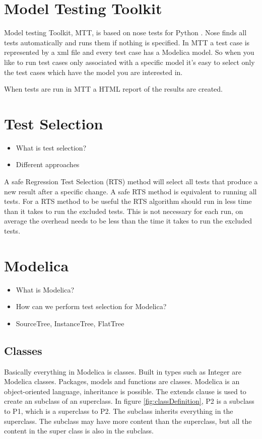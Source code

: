 \documentclass{cslthse-msc}
\begin{document}
\section{Model Testing Toolkit}
Model testing Toolkit, MTT, is based on nose tests for Python \cite{noseDoc}. Nose finds all tests automatically and runs them if nothing is specified. In MTT a test case is represented by a xml file and every test case has a Modelica model. So when you like to run test cases only associated with a specific model it's easy to select only the test cases which have the model you are interested in.

When tests are run in MTT a HTML report of the results are created.

\section{Test Selection}
\begin{itemize}
	\item What is test selection?
	\item Different approaches
\end{itemize}
A safe Regression Test Selection (RTS) method will select all tests that produce a new result after a specific change. A safe RTS method is equivalent to running all tests. For a RTS method to be useful the RTS algorithm should run in less time than it takes to run the excluded tests. This is not necessary for each run, on average the overhead needs to be less than the time it takes to run the excluded tests.


\section{Modelica}
\begin{itemize}
	\item What is Modelica?
	\item How can we perform test selection for Modelica?
	\item SourceTree, InstanceTree, FlatTree
	\end{itemize}

\subsection{Classes}
Basically everything in Modelica is classes. Built in types such as Integer are Modelica classes. Packages, models and functions are classes. Modelica is an object-oriented language, inheritance is possible. The extends clause is used to create an subclass of an superclass. In figure \ref{fig:classDefinition}, P2 is a subclass to P1, which is a superclass to P2. The subclass inherits everything in the superclass. The subclass may have more content than the superclass, but all the content in the super class is also in the subclass. 
\end{document}
